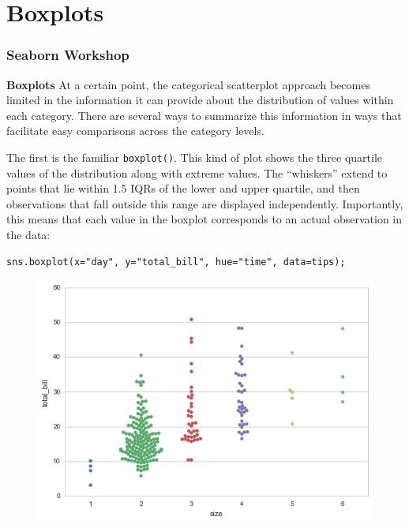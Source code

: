 \documentclass{beamer}
\begin{document}
\section{Boxplots}
\begin{frame}[fragile]
\frametitle{Seaborn Workshop}
\large
\noindent \textbf{Boxplots}
At a certain point, the categorical scatterplot approach becomes limited in the information it can provide about the distribution of values within each category. There are several ways to summarize this information in ways that facilitate easy comparisons across the category levels.
\end{frame}
\begin{frame}[fragile]
The first is the familiar \texttt{boxplot()}. This kind of plot shows the three quartile values of the distribution along with extreme values. The “whiskers” extend to points that lie within 1.5 IQRs of the lower and upper quartile, and then observations that fall outside this range are displayed independently. Importantly, this means that each value in the boxplot corresponds to an actual observation in the data:
\end{frame}
\begin{frame}[fragile]
\begin{verbatim}
sns.boxplot(x="day", y="total_bill", hue="time", data=tips);
\end{verbatim}
\begin{figure}
	\centering
	\includegraphics[width=0.7\linewidth]{images/categorical_17_0}
\end{figure}
\end{frame}
\end{document}
